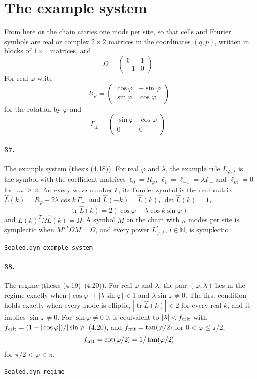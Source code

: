 \documentclass[11pt]{article}
\begin{document}
\section*{The example system}
From here on the chain carries one mode per site, so that cells and Fourier symbols are real or complex $2 \times 2$ matrices in the coordinates $(q, p)$, written in blocks of $1 \times 1$ matrices, and \[\Omega = \begin{pmatrix} 0 & 1 \\ -1 & 0 \end{pmatrix}.\] For real $\varphi$ write \[R_\varphi = \begin{pmatrix} \cos\varphi & -\sin\varphi \\ \sin\varphi & \cos\varphi \end{pmatrix}\] for the rotation by $\varphi$ and \[\Gamma_\pm = \begin{pmatrix} \sin\varphi & \cos\varphi \\ 0 & 0 \end{pmatrix}.\]

\paragraph{37.} The example system (thesis (4.18)). For real $\varphi$ and $\lambda$, the example rule $L_{\varphi, \lambda}$ is the symbol with the coefficient matrices $\ell_0 = R_\varphi$, $\ell_1 = \ell_{-1} = \lambda \Gamma_\pm$ and $\ell_m = 0$ for $|m| \ge 2$. For every wave number $k$, its Fourier symbol is the real matrix $\hat L(k) = R_\varphi + 2\lambda\cos k\,\Gamma_\pm$, and $\hat L(-k) = \hat L(k)$, $\det \hat L(k) = 1$, \[\operatorname{tr} \hat L(k) = 2(\cos\varphi + \lambda \cos k \sin\varphi)\] and $\hat L(k)^T \Omega \hat L(k) = \Omega$. A symbol $M$ on the chain with $n$ modes per site is symplectic when $M^{\star T} \Omega M = \Omega$, and every power $L_{\varphi, \lambda}^t$, $t \in \mathbb N$, is symplectic.\par{\footnotesize\texttt{Sealed.dyn\_example\_system}}

\paragraph{38.} The regime (thesis (4.19)–(4.20)). For real $\varphi$ and $\lambda$, the pair $(\varphi, \lambda)$ lies in the regime exactly when $|\cos\varphi| + |\lambda\sin\varphi| < 1$ and $\lambda\sin\varphi \neq 0$. The first condition holds exactly when every mode is elliptic, $|\operatorname{tr}\hat L(k)| < 2$ for every real $k$, and it implies $\sin\varphi \neq 0$. For $\sin\varphi \neq 0$ it is equivalent to $|\lambda| < f_{\rm crit}$ with $f_{\rm crit} = (1 - |\cos\varphi|)/|\sin\varphi|$ (4.20), and $f_{\rm crit} = \tan(\varphi/2)$ for $0 < \varphi \le \pi/2$, \[f_{\rm crit} = \cot(\varphi/2) = 1/\tan(\varphi/2)\] for $\pi/2 < \varphi < \pi$.\par{\footnotesize\texttt{Sealed.dyn\_regime}}
\end{document}
